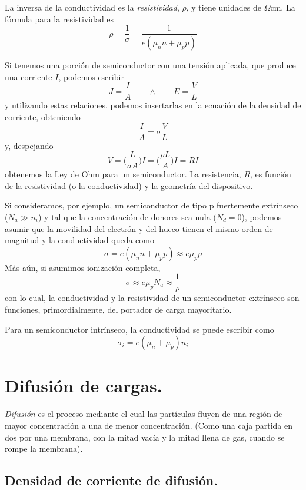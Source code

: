 \documentclass[12pt,a4paper]{article}
\begin{document}
La inversa de la conductividad es la \emph{resistividad}, $\rho$, y tiene unidades de $\Omega \textrm{cm}$. La fórmula para la resistividad es
\[ \rho = \frac{1}{\sigma} = \frac{1}{e(\mu _{n}n+\mu _{p} p)} \]

Si tenemos una porción de semiconductor con una tensión aplicada, que produce una corriente $I$, podemos escribir
\[ J = \frac{I}{A} \qquad \wedge \qquad E= \frac{V}{L} \]
y utilizando estas relaciones, podemos insertarlas en la ecuación de la densidad de corriente, obteniendo
\[ \frac{I}{A} = \sigma \frac{V}{L} \]
y, despejando
\[ V = \bigg( \frac{L}{\sigma A} \bigg) I = \bigg( \frac{\rho L}{A} \bigg) I = RI \]
obtenemos la Ley de Ohm para un semiconductor. La resistencia, $R$, es función de la resistividad (o la conductividad) y la geometría del dispositivo.

Si consideramos, por ejemplo, un semiconductor de tipo p fuertemente extrínseco ($N_{a}\gg n_{i}$) y tal que la concentración de donores sea nula ($N_{d}=0$), podemos asumir que la movilidad del electrón y del hueco tienen el mismo orden de magnitud y la conductividad queda como
\[ \sigma = e(\mu _{n}n+\mu _{p} p) \approx e \mu _{p} p \]
Más aún, si asumimos ionización completa,
\[ \sigma \approx e \mu _{p} N_{a} \approx \frac{1}{\rho} \]
con lo cual, la conductividad y la resistividad de un semiconductor extrínseco son funciones, primordialmente, del portador de carga mayoritario.

Para un semiconductor intrínseco, la conductividad se puede escribir como
\[ \sigma _{i} = e  (\mu _{n} + \mu _{p}) n_{i} \]

\section{Difusión de cargas.}

\emph{Difusión} es el proceso mediante el cual las partículas fluyen de una región de mayor concentración a una de menor concentración. (Como una caja partida en dos por una membrana, con la mitad vacía y la mitad llena de gas, cuando se rompe la membrana).

\subsection{Densidad de corriente de difusión.}
\end{document}
